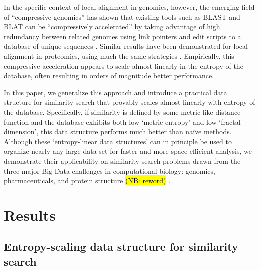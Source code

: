 \documentclass[review,preprint,12pt]{elsarticle}
\theoremstyle{definition}
\theoremstyle{remark}
\numberwithin{equation}{section}
\begin{document}
In the specific context of local alignment in genomics, however, the emerging field of ``compressive genomics'' has shown that existing tools such as BLAST and BLAT can be ``compressively accelerated'' by taking advantage of high redundancy between related genomes using link pointers and edit scripts to a database of unique sequences \cite{loh2012compressive}.
Similar results have been demonstrated for local alignment in proteomics, using much the same strategies \cite{daniels2013compressive}.
Empirically, this compressive acceleration appears to scale almost linearly in the entropy of the database, often resulting in orders of magnitude better performance.

In this paper, we generalize this approach and introduce a practical data structure for similarity search that provably scales almost linearly with entropy of the database.
Specifically, if similarity is defined by some metric-like distance function and the database exhibits both low `metric entropy' and low `fractal dimension', this data structure performs much better than na\"ive methods.
Although these `entropy-linear data structures' can in principle be used to organize nearly any large data set for faster and more space-efficient analysis,
we demonstrate their applicability on similarity search problems drawn from the three major Big Data challenges in computational biology: genomics, pharmaceuticals, and protein structure \hl{(NB: reword)} \cite{marx2013biology}.

\section{Results}
\subsection{Entropy-scaling data structure for similarity search}
\end{document}
